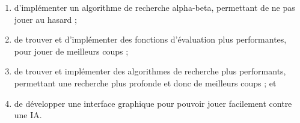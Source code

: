 \begin{enumerate}
		\vspace{1em}
		\item d'implémenter un algorithme de recherche alpha-beta, permettant de ne pas
			jouer au hasard ;

		\vspace{1em}
		\item de trouver et d'implémenter des fonctions d'évaluation plus performantes,
			pour jouer de meilleurs coups ;

		\vspace{1em}
		\item de trouver et implémenter des algorithmes de recherche plus performants,
			permettant une recherche plus profonde et donc de meilleurs coups ; et

		\vspace{1em}
		\item de développer une interface graphique pour pouvoir jouer facilement contre
			une IA.
	\end{enumerate}
